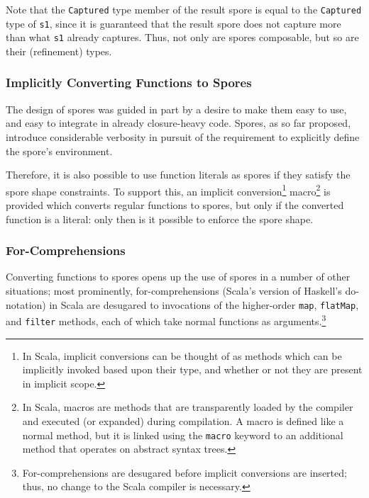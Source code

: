 \documentclass[runningheads]{llncs}
\begin{document}
\begin{sloppypar}
\noindent Note that the \verb|Captured| type member of the result spore is equal to the
\verb|Captured| type of \verb|s1|, since it is guaranteed that the result
spore does not capture more than what \verb|s1| already captures. Thus, not
only are spores composable, but so are their (refinement) types.


\vspace{1mm}
\subsubsection{Implicitly Converting Functions to Spores}

The design of spores was guided in part by a desire to make them easy to use,
and easy to integrate in already closure-heavy code. Spores, as so far
proposed, introduce considerable verbosity in pursuit of the requirement to
explicitly define the spore's environment.

Therefore, it is also possible to use function literals as spores if they
satisfy the spore shape constraints. To support this, an implicit
conversion\footnote{In Scala, implicit conversions can be thought of as methods which can be implicitly invoked based upon their type, and whether or not they are present in implicit scope.}
macro\footnote{In Scala, macros are methods that are transparently loaded by the compiler and executed (or expanded) during compilation. A macro is defined like a normal method, but it is linked using the \texttt{macro} keyword to an additional method that operates on abstract syntax trees.} is provided which converts regular
functions to spores, but only if the converted function is a literal: only
then is it possible to enforce the spore shape.

\vspace{1mm}
\subsubsection{For-Comprehensions}

Converting functions to spores opens up the use of spores in a number of other
situations; most prominently, for-comprehensions (Scala's version of Haskell's do-notation) in Scala
are desugared to invocations of the higher-order \verb|map|, \verb|flatMap|, and \verb|filter|
methods, each of which take normal functions as arguments.\footnote{For-comprehensions are desugared
before implicit conversions are inserted; thus, no change to the Scala compiler is necessary.}


\end{sloppypar}
\end{document}
